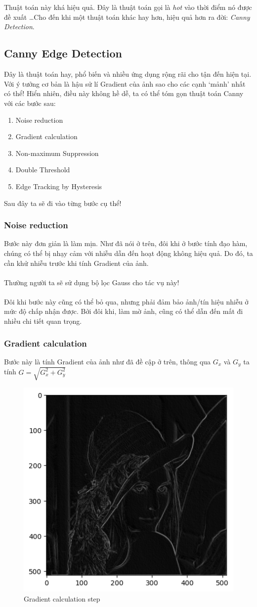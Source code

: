 \documentclass{article}
\begin{document}
    \phantom{a}\\\\
    Thuật toán này khá hiệu quả. Đây là thuật toán gọi là \textit{hot} vào thời điểm nó được đề xuất \ldots Cho đến khi một thuật toán khác hay hơn, hiệu quả hơn ra đời: \textit{Canny Detection}.
    \subsection{Canny Edge Detection}
    Đây là thuật toán hay, phổ biến và nhiều ứng dụng rộng rãi cho tận đến hiện tại. Với ý tưởng cơ bản là hậu sử lí Gradient của ảnh sao cho các cạnh `mảnh' nhất có thể! Hiển nhiên, điều này không hề dễ, ta có thể tóm gọn thuật toán Canny với các bước sau:
    \begin{enumerate}
        \item Noise reduction
        \item Gradient calculation
        \item Non-maximum Suppression
        \item Double Threshold
        \item Edge Tracking by Hysteresis
    \end{enumerate}
    Sau đây ta sẽ đi vào từng bước cụ thể!
    \subsubsection{Noise reduction}
    Bước này đơn giản là làm mịn. Như đã nói ở trên, đôi khi ở bước tính đạo hàm, chúng có thể bị nhạy cảm với nhiễu dẫn đến hoạt động không hiệu quả. Do đó, ta cần khử nhiễu trước khi tính Gradient của ảnh. \\\\
    Thường người ta sẽ sử dụng bộ lọc Gauss cho tác vụ này!\\\\
    Đôi khi bước này cũng có thể bỏ qua, nhưng phải đảm bảo ảnh/tín hiệu nhiễu ở mức độ chấp nhận được. Bởi đôi khi, làm mờ ảnh, cũng có thể dẫn đến mất đi nhiều chi tiết quan trọng.
    \subsubsection{Gradient calculation}
    Bước này là tính Gradient của ảnh như đã đề cập ở trên, thông qua $G_x$ và $G_y$ ta tính $G = \sqrt{G_x^2+G_y^2}$
    \begin{figure}[ht!]
        \centering
        \includegraphics[width = 0.5\linewidth]{fig8.png}
        \caption{Gradient calculation step}
        \label{fig9}
    \end{figure}
\end{document}
